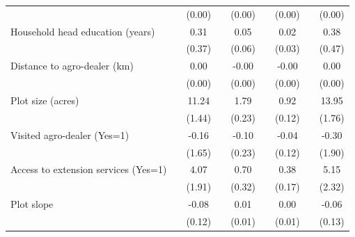 {\begin{tabular}{l*{8}{c}}
                &                  &   (0.00)         &                  &   (0.00)         &                  &   (0.00)         &                  &   (0.00)         \\
Household head education (years)&                  &     0.31         &                  &     0.05         &                  &     0.02         &                  &     0.38         \\
                &                  &   (0.37)         &                  &   (0.06)         &                  &   (0.03)         &                  &   (0.47)         \\
Distance to agro-dealer (km)&                  &     0.00         &                  &    -0.00         &                  &    -0.00         &                  &     0.00         \\
                &                  &   (0.00)         &                  &   (0.00)         &                  &   (0.00)         &                  &   (0.00)         \\
Plot size (acres)&                  &    11.24\sym{***}&                  &     1.79\sym{***}&                  &     0.92\sym{***}&                  &    13.95\sym{***}\\
                &                  &   (1.44)         &                  &   (0.23)         &                  &   (0.12)         &                  &   (1.76)         \\
Visited agro-dealer (Yes=1)&                  &    -0.16         &                  &    -0.10         &                  &    -0.04         &                  &    -0.30         \\
                &                  &   (1.65)         &                  &   (0.23)         &                  &   (0.12)         &                  &   (1.90)         \\
Access to extension services (Yes=1)&                  &     4.07\sym{**} &                  &     0.70\sym{**} &                  &     0.38\sym{**} &                  &     5.15\sym{**} \\
                &                  &   (1.91)         &                  &   (0.32)         &                  &   (0.17)         &                  &   (2.32)         \\
Plot slope      &                  &    -0.08         &                  &     0.01         &                  &     0.00         &                  &    -0.06         \\
                &                  &   (0.12)         &                  &   (0.01)         &                  &   (0.01)         &                  &   (0.13)         \\

\end{tabular}}
